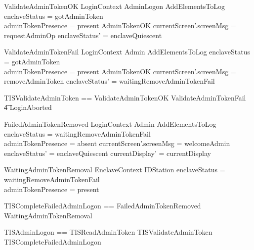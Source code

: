 \begin{schema}{ValidateAdminTokenOK}
        LoginContext
\also
        AdminLogon
\also
        AddElementsToLog
\where
        enclaveStatus = gotAdminToken
\\      adminTokenPresence = present
\also
        AdminTokenOK
\also   
        currentScreen'.screenMsg = requestAdminOp 
\also
        enclaveStatus' = enclaveQuiescent
\end{schema}

\begin{schema}{ValidateAdminTokenFail}
        LoginContext
\also
        \Xi Admin
\also
        AddElementsToLog
\where
        enclaveStatus = gotAdminToken
\\      adminTokenPresence = present
\also
        \lnot AdminTokenOK
\also
        currentScreen'.screenMsg = removeAdminToken
\also
        enclaveStatus' = waitingRemoveAdminTokenFail
\end{schema}

\begin{zed}
        TISValidateAdminToken == ValidateAdminTokenOK \lor
        ValidateAdminTokenFail 
\\ \t4  \lor
        LoginAborted
\end{zed}

\begin{schema}{FailedAdminTokenRemoved}
        LoginContext
\also
        \Xi Admin
\also 
        AddElementsToLog
\where
        enclaveStatus = waitingRemoveAdminTokenFail
\\      adminTokenPresence = absent
\also
        currentScreen'.screenMsg = welcomeAdmin
\also
        enclaveStatus' = enclaveQuiescent
\also
        currentDisplay' = currentDisplay
\end{schema}

\begin{schema}{WaitingAdminTokenRemoval}
        EnclaveContext
\also
        \Xi IDStation
\where
        enclaveStatus = waitingRemoveAdminTokenFail
\\      adminTokenPresence = present     
\end{schema}

\begin{zed}
        TISCompleteFailedAdminLogon == FailedAdminTokenRemoved 
\lor WaitingAdminTokenRemoval
\end{zed}

\begin{zed}
        TISAdminLogon == TISReadAdminToken \lor TISValidateAdminToken \lor TISCompleteFailedAdminLogon
\end{zed}

